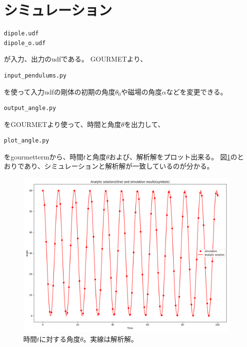 \documentclass[a4paper,11pt]{jarticle}
\begin{document}
\section{シミュレーション}
\begin{verbatim}
dipole.udf
dipole_o.udf
\end{verbatim}
が入力、出力のudfである。
GOURMETより、
\begin{verbatim}
input_pendulums.py
\end{verbatim}
を使って入力udfの剛体の初期の角度$\theta_0$や磁場の角度$\alpha$などを変更できる。

\begin{verbatim}
output_angle.py
\end{verbatim}
をGOURMETより使って、時間と角度$\theta$を出力して、
\begin{verbatim}
plot_angle.py
\end{verbatim}
をgourmettermから、時間$t$と角度$\theta$および、解析解をプロット出来る。
図\ref{fig:time_angle}のとおりであり、シミュレーションと解析解が一致しているのが分かる。
\begin{figure}[h]
\centering
  \includegraphics[clip,width=0.9\linewidth]{time_angle.png}
  \caption{時間$t$に対する角度$\theta$。実線は解析解。
  }
  \label{fig:time_angle}
\end{figure}
\end{document}
